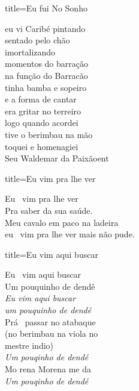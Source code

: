 \documentclass[fontsize=14pt, paper=a4, twoside, DIV=20]{scrreprt} %
\begin{document}
\begin{multicols*}{2}
\begin{song}{title={Eu fui No Sonho}}
\begin{verse*}
            eu vi Caribé pintando\\
            sentado pelo chão\\
            imortalizando\\
            momentos do barração\\

            na função do Barracão\\
            tinha bamba e sopeiro\\
            e a forma de cantar\\
            era gritar no terreiro\\


            logo quando acordei\\
            tive o berimbau na mão\\
            toquei e homenagiei\\
            Seu Waldemar da Paixãoent\\
    \end{verse*}
\end{song}

\begin{song}{title={Eu vim pra lhe ver}}
       \begin{verse*}
           Eu \ vim pra lhe ver\\
            Pra saber da sua saúde.\\
            Meu cavalo em paco na ladeira\\
            eu \ vim pra lhe ver mais não pude.\\
       \end{verse*}
\end{song}

\columnbreak

\begin{song}{title={Eu vim aqui buscar}}
        \begin{verse*}
            Eu \ vim aqui buscar\\
            Um pouquinho de dendê\\
            \textit{Eu vim aqui buscar}\\
            \textit{ um pouquinho de dendé}\\
            Prá \  passar no atabaque \\
            (no berimbau na viola no\\
            mestre indio)\\
            \textit{Um}\textit{ pouqinho de dendé}\\
            Mo rena Morena me da\\
            \textit{Um}\textit{ pouqinho de dendé}\\
        \end{verse*}
\end{song}


\end{multicols*}
\end{document}
